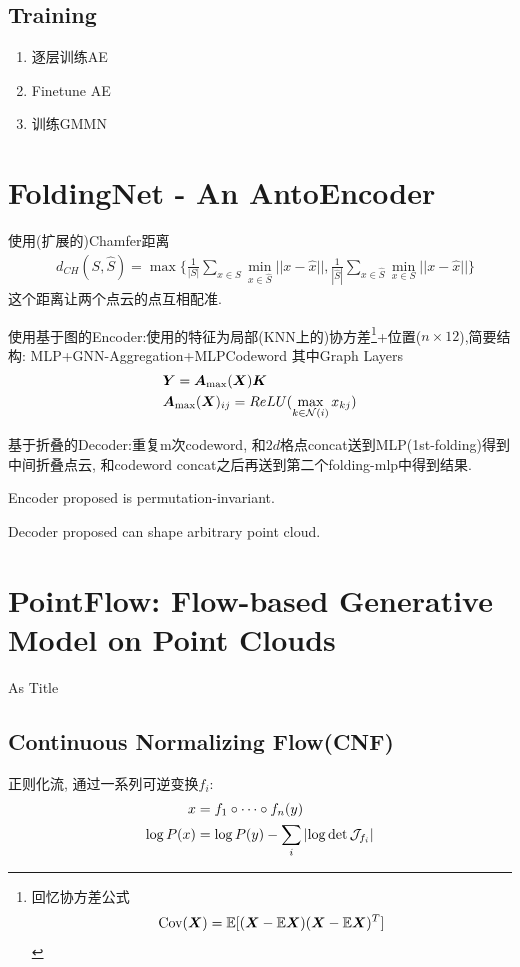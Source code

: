 \documentclass{article}
\begin{document}
\subsection{Training}
    \begin{enumerate}
        \item 逐层训练AE
        \item Finetune AE 
        \item 训练GMMN
    \end{enumerate}

\section{FoldingNet - An AntoEncoder}
    
    使用(扩展的)Chamfer距离
    \begin{align}
        &d_{CH}(S, \widehat S)=\max\{
            \frac{1}{|S|} \sum_{x\in S} \min_{x\in \widehat S} ||x-\widehat x||,
            \frac{1}{|\widehat S|} \sum_{x\in \widehat S} \min_{x\in S} ||x-\widehat x||
        \}
    \end{align}
    这个距离让两个点云的点互相配准.

    使用基于图的Encoder:使用的特征为局部(KNN上的)协方差\footnote{
        回忆协方差公式\[
            \cov(\bs X) = \bb E[(\bs X-\bb E \bs X)(\bs X-\bb E \bs X)^T]  
        \]    }+位置($n\times 12$),简要结构: MLP+GNN-Aggregation+MLP\trarr Codeword
    其中Graph Layers
    \begin{align}
        &\bs Y = \bs A_{\max}(\bs X)\bs K\\
        &\bs A_{\max}(\bs X)_{ij} = ReLU(\max_{k\in \mathcal N(i)} x_{kj})
    \end{align}

    基于折叠的Decoder:重复m次codeword, 和$2d$格点concat送到MLP(1st-folding)得到中间折叠点云, 和codeword concat之后再送到第二个folding-mlp中得到结果.

     Encoder proposed is permutation-invariant.

     Decoder proposed can shape arbitrary point cloud.

\section{PointFlow: Flow-based Generative Model on Point Clouds}

     As Title
\subsection{Continuous Normalizing Flow(CNF)}
    正则化流, 通过一系列可逆变换$f_i$:
    \begin{align}
        x &= f_1 \circ \dots \circ f_n (y)\\
        \log P(x) &= \log P(y) - \sum_i \left|
            \log \det \cal J_{f_i}
        \right|
    \end{align}
\end{document}
